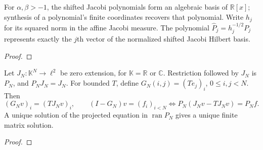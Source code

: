 \begin{supporting}
\begin{theorem}
\label{thm:unit-jacobi-coordinates}
\leanok
For $\alpha,\beta>-1$, the shifted Jacobi polynomials form an algebraic
basis of $\mathbb R[x]$; synthesis of a polynomial's finite coordinates
recovers that polynomial. Write $h_j$ for its squared norm in the affine
Jacobi measure. The polynomial $\widehat P_j=h_j^{-1/2}P_j$ represents
exactly the $j$th vector of the normalized shifted Jacobi Hilbert basis.
\end{theorem}
\begin{proof}
\leanok
\end{proof}

\begin{theorem}
\label{thm:l2-finite-matrices}
\leanok
Let $J_N:\mathbb K^N\to\ell^2$ be zero extension, for $\mathbb K=\mathbb R$
or $\mathbb C$. Restriction followed by $J_N$ is $P_N$, and $P_NJ_N=J_N$.
For bounded $T$, define $G_N(i,j)=(Te_j)_i$, $0\le i,j<N$. Then
\[
 (G_Nv)_i=(TJ_Nv)_i,\qquad
 (I-G_N)v=(f_i)_{i<N}
 \iff P_N(J_Nv-TJ_Nv)=P_Nf.
\]
A unique solution of the projected equation in $\operatorname{ran}P_N$
gives a unique finite matrix solution.
\end{theorem}
\begin{proof}
\leanok
\end{proof}


\end{supporting}
